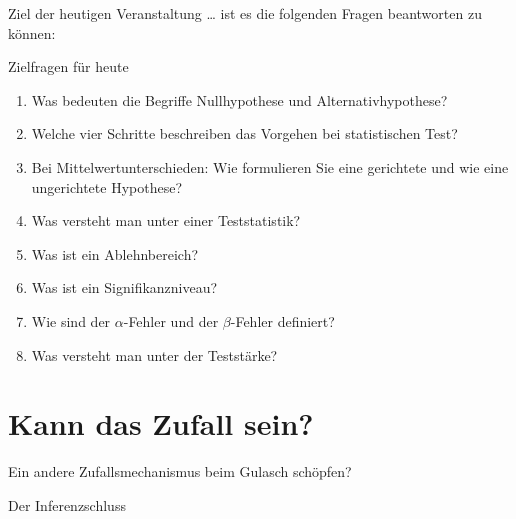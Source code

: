 \documentclass[usenames,dvipsnames,handout]{beamer}
\begin{document}
\begin{frame}{Ziel der heutigen Veranstaltung \dots}
ist es die folgenden Fragen beantworten zu können:
\begin{block}{Zielfragen für heute}
\begin{enumerate}
\item{Was bedeuten die Begriffe Nullhypothese und Alternativhypothese?}
\item{Welche vier Schritte beschreiben das Vorgehen bei statistischen Test?}
\item{Bei Mittelwertunterschieden: Wie formulieren Sie eine gerichtete und wie eine ungerichtete 
Hypothese?}
\item{Was versteht man unter einer Teststatistik?}
\item{Was ist ein Ablehnbereich?}
\item{Was ist ein Signifikanzniveau?}
\item{Wie sind der $\alpha$-Fehler und der $\beta$-Fehler definiert?}
\item{Was versteht man unter der Teststärke?}
\end{enumerate}
\end{block}
\end{frame}
\section{Kann das Zufall sein?}

\begin{frame}{Ein andere Zufallsmechanismus beim Gulasch schöpfen?}
\end{frame}
\begin{frame}{Der Inferenzschluss}
\end{frame}
\end{document}

